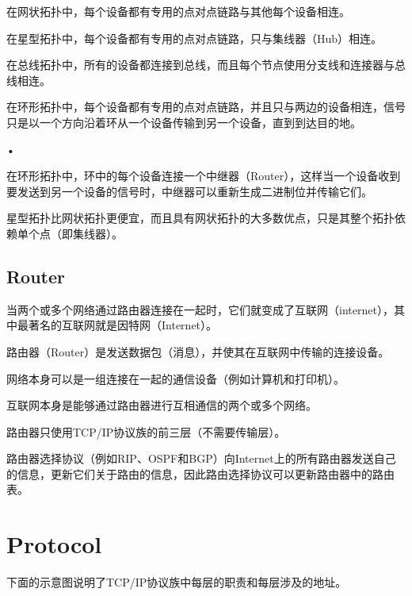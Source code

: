 \begin{compactitem}
\item 在网状拓扑中，每个设备都有专用的点对点链路与其他每个设备相连。
\item 在星型拓扑中，每个设备都有专用的点对点链路，只与集线器（Hub）相连。
\item 在总线拓扑中，所有的设备都连接到总线，而且每个节点使用分支线和连接器与总线相连。
\item 在环形拓扑中，每个设备都有专用的点对点链路，并且只与两边的设备相连，信号只是以一个方向沿着环从一个设备传输到另一个设备，直到到达目的地。
\end{compactitem}•

在环形拓扑中，环中的每个设备连接一个中继器（Router），这样当一个设备收到要发送到另一个设备的信号时，中继器可以重新生成二进制位并传输它们。

星型拓扑比网状拓扑更便宜，而且具有网状拓扑的大多数优点，只是其整个拓扑依赖单个点（即集线器）。

\section{Router}



当两个或多个网络通过路由器连接在一起时，它们就变成了互联网（internet），其中最著名的互联网就是因特网（Internet）。

路由器（Router）是发送数据包（消息），并使其在互联网中传输的连接设备。

\begin{compactitem}
\item 网络本身可以是一组连接在一起的通信设备（例如计算机和打印机）。
\item 互联网本身是能够通过路由器进行互相通信的两个或多个网络。
\item 路由器只使用TCP/IP协议族的前三层（不需要传输层）。
\end{compactitem}

路由器选择协议（例如RIP、OSPF和BGP）向Internet上的所有路由器发送自己的信息，更新它们关于路由的信息，因此路由选择协议可以更新路由器中的路由表。

\chapter{Protocol}

下面的示意图说明了TCP/IP协议族中每层的职责和每层涉及的地址。

